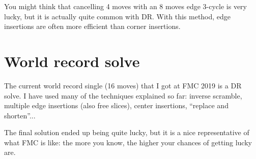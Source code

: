 \documentclass[11pt,a4paper]{book}
\begin{document}
You might think that cancelling 4 moves with an 8 moves edge 3-cycle is very lucky, but it is actually quite common with DR. With this method, edge insertions are often more efficient than corner insertions.

\section{World record solve}

The current world record single (16 moves) that I got at FMC 2019 is a DR solve. I have used many of the techniques explained so far: inverse scramble, multiple edge insertions (also free slices), center insertions, ``replace and shorten''... 

The final solution ended up being quite lucky, but it is a nice representative of what FMC is like: the more you know, the higher your chances of getting lucky are.
\end{document}
